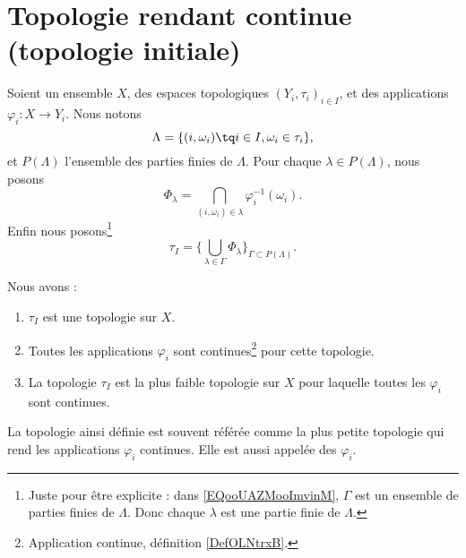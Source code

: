 \section{Topologie rendant continue (topologie initiale)}

\begin{propositionDef}     \label{PROPooGOEVooZBAOQh}
	Soient un ensemble \( X\), des espaces topologiques \( (Y_i,\tau_i)_{i\in I}\), et des applications \( \varphi_i\colon X\to Y_i\). Nous notons
	\begin{equation}
		\Lambda=\{ (i,\omega_i)\tq i\in I, \omega_i\in \tau_i \},
	\end{equation}
	et \( P(\Lambda)\) l'ensemble des parties finies de \( \Lambda\). Pour chaque \( \lambda\in P(\Lambda)\), nous posons
	\begin{equation}
		\Phi_{\lambda}=\bigcap_{(i,\omega_i)\in \lambda}\varphi_i^{-1}(\omega_i).
	\end{equation}
	Enfin nous posons\footnote{ Juste pour être explicite : dans \eqref{EQooUAZMooImvinM}, \( \Gamma\) est un ensemble de parties finies de \( \Lambda\). Donc chaque \( \lambda\) est une partie finie de \( \Lambda\). }
	\begin{equation}		\label{EQooUAZMooImvinM}
		\tau_I=\Big\{   \bigcup_{\lambda\in \Gamma}\Phi_{\lambda}  \Big\}_{\Gamma\subset P(\Lambda)}.
	\end{equation}


	Nous avons :
	\begin{enumerate}
		\item
		      \( \tau_I\) est une topologie sur \( X\).
		\item
		      Toutes les applications \( \varphi_i\) sont continues\footnote{Application continue, définition \ref{DefOLNtrxB}.} pour cette topologie.
		\item
		      La topologie \( \tau_I\) est la plus faible topologie sur \( X\) pour laquelle toutes les \( \varphi_i\) sont continues.
	\end{enumerate}

	La topologie ainsi définie est souvent référée comme la plus petite topologie qui rend les applications \( \varphi_i\) continues. Elle est aussi appelée  des \( \varphi_i\).
\end{propositionDef}

